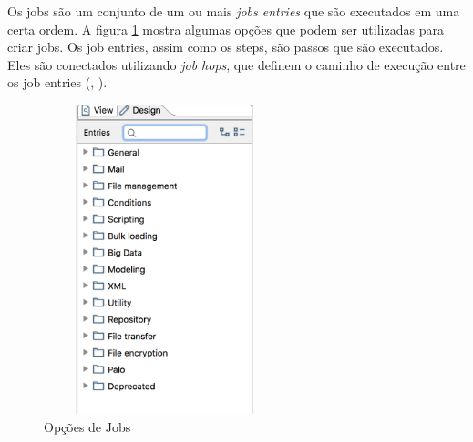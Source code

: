 Os jobs são um conjunto de um ou mais \textit{jobs entries} que são executados em uma certa ordem. A figura \ref{jobsOptions} mostra algumas opções que podem ser utilizadas para criar jobs. Os job entries, assim como os steps, são passos que são executados. Eles são conectados utilizando \textit{job hops}, que definem o caminho de execução entre os job entries (\citeauthor{kettle}, \citeyear{kettle}).
\begin{figure}[H]
\centering
\includegraphics[width=7cm, height=9cm]{imagens/opcoes_de_jobs.png}
\caption{Opções de Jobs}
\label{jobsOptions}
\end{figure}
